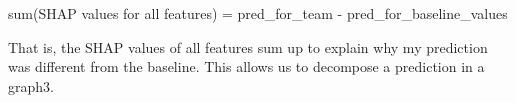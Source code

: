 \documentclass[12pt]{report}
\begin{document}
sum(SHAP values for all features) = pred\_for\_team - pred\_for\_baseline\_values

That is, the SHAP values of all features sum up to explain why my prediction was different from the baseline. This allows us to decompose a prediction in a graph3.



















%


\end{document}
